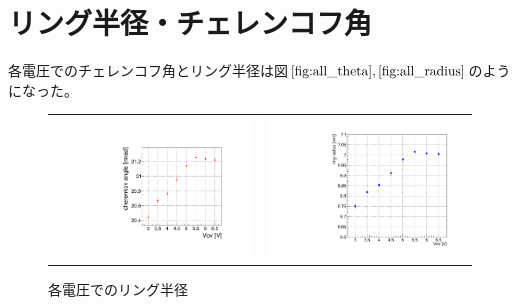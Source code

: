 \documentclass[uplatex, titlepage, dvipdfmx, 12pt, a4paper]{jsreport}
\begin{document}

  \section{リング半径・チェレンコフ角}
    各電圧でのチェレンコフ角とリング半径は図$\ref{fig:all_theta}, \ref{fig:all_radius}$のようになった。
    \begin{figure}[h]
      \begin{tabular}{cc}
        \begin{minipage}[t]{0.45\hsize}
          \centering
          \includegraphics[scale=0.4, clip]{image/theta_allV.pdf}
          \caption{各電圧でのチェレンコフ角} 
          \label{fig:all_theta} 
        \end{minipage} &
        \begin{minipage}[t]{0.45\hsize}
          \centering
          \includegraphics[scale=0.3, clip]{image/all_radius.pdf}
          \caption{各電圧でのリング半径} 
          \label{fig:all_radius} 
        \end{minipage}
      \end{tabular}
    \end{figure}
\end{document}
